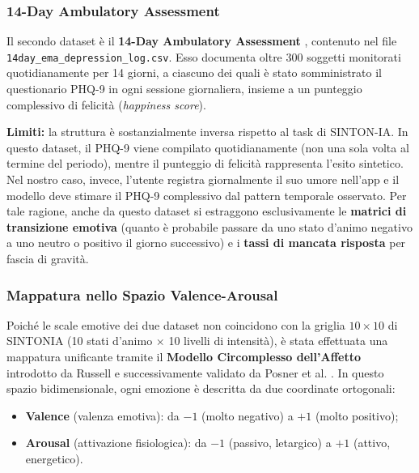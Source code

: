 \subsubsection{14-Day Ambulatory Assessment}

Il secondo dataset è il \textbf{14-Day Ambulatory Assessment} \cite{kaggle_14day_depression}, contenuto nel file \texttt{14day\_\allowbreak{}ema\_\allowbreak{}depression\_\allowbreak{}log.csv}. Esso documenta oltre 300 soggetti monitorati quotidianamente per 14 giorni, a ciascuno dei quali è stato somministrato il questionario PHQ-9 in ogni sessione giornaliera, insieme a un punteggio complessivo di felicità (\textit{happiness score}).

\textbf{Limiti:} la struttura è sostanzialmente inversa rispetto al task di SINTON-IA. In questo dataset, il PHQ-9 viene compilato quotidianamente (non una sola volta al termine del periodo), mentre il punteggio di felicità rappresenta l'esito sintetico. Nel nostro caso, invece, l'utente registra giornalmente il suo umore nell'app e il modello deve stimare il PHQ-9 complessivo dal pattern temporale osservato. Per tale ragione, anche da questo dataset si estraggono esclusivamente le \textbf{matrici di transizione emotiva} (quanto è probabile passare da uno stato d'animo negativo a uno neutro o positivo il giorno successivo) e i \textbf{tassi di mancata risposta} per fascia di gravità.

\subsubsection{Mappatura nello Spazio Valence-Arousal}

Poiché le scale emotive dei due dataset non coincidono con la griglia $10 \times 10$ di SINTONIA (10 stati d'animo $\times$ 10 livelli di intensità), è stata effettuata una mappatura unificante tramite il \textbf{Modello Circomplesso dell'Affetto} introdotto da Russell \cite{russell1980circumplex} e successivamente validato da Posner et al. \cite{posner2005circumplex}. In questo spazio bidimensionale, ogni emozione è descritta da due coordinate ortogonali:
\begin{itemize}
    \item \textbf{Valence} (valenza emotiva): da $-1$ (molto negativo) a $+1$ (molto positivo);
    \item \textbf{Arousal} (attivazione fisiologica): da $-1$ (passivo, letargico) a $+1$ (attivo, energetico).
\end{itemize}

